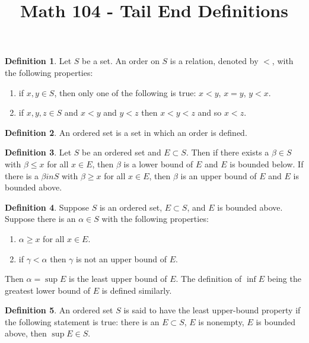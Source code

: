 \documentclass[12pt]{article}
\theoremstyle{definition}
\newtheorem{definition}{Definition}
\theoremstyle{named}
\begin{document}
\title{Math 104 - Tail End Definitions}
\author{}
\date{}
\maketitle
\date

\renewcommand{\thedefinition}{6.1}
\begin{definition}
    Let $S$ be a set. An order on $S$ is a relation, denoted by $<$, with the following properties: 
    \begin{enumerate}
        \item if $x,y \in S$, then only one of the following is true: $x<y$, $x=y$, $y<x$. 
        \item if $x,y,z \in S$ and $x<y$ and $y<z$ then $x<y<z$ and so $x<z$. 
    \end{enumerate}
\end{definition}

\renewcommand{\thedefinition}{6.1}
\begin{definition}
    An ordered set is a set in which an order is defined. 
\end{definition}

\renewcommand{\thedefinition}{6.1}
\begin{definition}
    Let $S$ be an ordered set and $E \subset S$. Then if there exists a $\beta \in S$ with $\beta \leq x$ for all $x \in E$, then $\beta$ is a lower bound of $E$ and $E$ is bounded below. If there is a $\beta in S$ with $\beta \geq x$ for all $x \in E$, then $\beta$ is an upper bound of $E$ and $E$ is bounded above. 
\end{definition}

\renewcommand{\thedefinition}{6.1}
\begin{definition}
    Suppose $S$ is an ordered set, $E \subset S$, and $E$ is bounded above. Suppose there is an $\alpha \in S$ with the following properties: 
    \begin{enumerate}
        \item $\alpha \geq x$ for all $x \in E$.
        \item if $\gamma < \alpha$ then $\gamma$ is not an upper bound of $E$.
    \end{enumerate}
    Then $\alpha = \sup E$ is the least upper bound of $E$. The definition of $\inf E$ being the greatest lower bound of $E$ is defined similarly. 
\end{definition}

\renewcommand{\thedefinition}{6.1}
\begin{definition}
    An ordered set $S$ is said to have the least upper-bound property if the following statement is true: there is an $E \subset S$, $E$ is nonempty, $E$ is bounded above, then $\sup E \in S$.
\end{definition}
\end{document}
